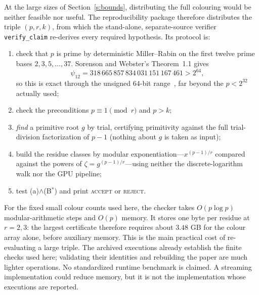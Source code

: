 At the large sizes of Section~\ref{s:bounds}, distributing the full colouring
would be neither feasible nor useful.  The reproducibility package therefore
distributes the triple $(p,r,k)$, from which the stand-alone, separate-source
verifier \texttt{verify\_claim} re-derives every required hypothesis.  Its
protocol is:
\begin{enumerate}
\item check that $p$ is prime by deterministic Miller--Rabin on the first
twelve prime bases $2,3,5,\dots,37$.  Sorenson and Webster's Theorem~1.1 gives
\[
  \psi_{12}=318\,665\,857\,834\,031\,151\,167\,461>2^{64},
\]
so this is exact through the unsigned $64$-bit
range~\cite{SorensonWebster2017}, far beyond the $p<2^{32}$ actually used;
\item check the preconditions $p\equiv1\pmod r$ and $p>k$;
\item \emph{find} a primitive root $g$ by trial, certifying primitivity against
the full trial-division factorization of $p-1$ (nothing about $g$ is taken as
input);
\item build the residue classes by modular exponentiation---$x^{(p-1)/r}$
compared against the powers of $\zeta=g^{(p-1)/r}$---using neither the
discrete-logarithm walk nor the GPU pipeline;
\item test (a)$\wedge$(B$^{*}$) and print \textsc{accept} or \textsc{reject}.
\end{enumerate}
For the fixed small colour counts used here, the checker takes
$O(p\log p)$ modular-arithmetic steps and $O(p)$ memory. It stores one byte
per residue at $r=2,3$: the largest certificate therefore requires about
$3.48$ GB for the colour array alone, before auxiliary memory. This is the
main practical cost of re-evaluating a large triple. The archived executions
already establish the finite checks used here; validating their identities
and rebuilding the paper are much lighter operations. No standardized
runtime benchmark is claimed. A streaming implementation could reduce memory,
but it is not the implementation whose executions are reported.
